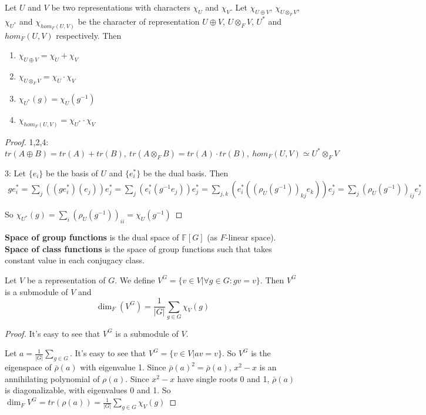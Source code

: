 \documentclass[12pt]{book}
\begin{document}
	\begin{theorem}
		Let $U$ and $V$ be two representations with characters $\chi_U$ and $\chi_V$. Let $\chi_{U\oplus V}$, $\chi_{U\otimes_F V}$, $\chi_{U^*}$ and $\chi_{hom_F(U,V)}$ be the character of representation $U\oplus V$, $U\otimes_F V$, $U^*$ and $hom_F(U,V)$ respectively. Then
		\begin{enumerate}
			\item $\chi_{U\oplus V}=\chi_U+\chi_V$
			\item $\chi_{U\otimes_F V}=\chi_U\cdot\chi_V$
			\item $\chi_{U^*}(g)=\chi_U(g^{-1})$
			\item $\chi_{hom_F(U,V)}=\chi_{U^*}\cdot\chi_V$
		\end{enumerate}
	\end{theorem}
	\begin{proof} 
		1,2,4:
		\begin{equation}
			tr(A\oplus B)=tr(A)+tr(B),\ tr(A\otimes_F B)=tr(A)\cdot tr(B),\ hom_F(U,V)\simeq U^*\otimes_F V
		\end{equation}
		
		3:
		Let $\{e_i\}$ be the basis of $U$ and $\{e_i^*\}$ be the dual basis. Then
		\begin{eqnarray}
			g e_i^*=\sum_j ((g e_i^*)(e_j))e_j^*=\sum_j (e_i^*(g^{-1}e_j))e_j^*=\sum_{j,k} (e_i^*((\rho_U(g^{-1}))_{kj}e_k))e_j^*=\sum_{j} (\rho_U(g^{-1}))_{ij}e_j^*
		\end{eqnarray}
		
		So $\chi_{U^*}(g)=\sum_i(\rho_U(g^{-1}))_{ii}=\chi_U(g^{-1})$
	\end{proof}
	
	\begin{definition}
		{\bf Space of group functions} is the dual space of $\mathbb F[G]$ (as $F$-linear space). {\bf Space of class functions} is the space of group functions such that takes constant value in each conjugacy class.
	\end{definition}
	
	\begin{theorem}
		Let $V$ be a representation of $G$. We define $V^G=\{v\in V|\forall g\in G:gv=v\}$. Then $V^G$ is a submodule of $V$ and  
		\begin{equation}
			\dim_F(V^G)=\frac 1 {|G|}\sum_{g\in G}\chi_V(g)
		\end{equation}
	\end{theorem}
	
	\begin{proof}
		It's easy to see that $V^G$ is a submodule of $V$.
	
		Let $a=\frac 1 {|G|}\sum_{g\in G } $. It's easy to see that $V^G=\{ v\in V|av=v\}$. So $V^G$ is the eigenspace of $\bar \rho(a)$ with eigenvalue 1. Since $\bar \rho(a)^2=\bar \rho(a)$, $x^2-x$ is an annihilating polynomial of $\rho(a)$. Since $x^2-x$ have single roots 0 and 1, $\bar \rho(a)$ is diagonalizable, with eigenvalues 0 and 1. So $\dim_FV^G=tr(\rho(a))=\frac 1 {|G|}\sum_{g\in G}\chi_V(g)$
	\end{proof}
	
\end{document}
